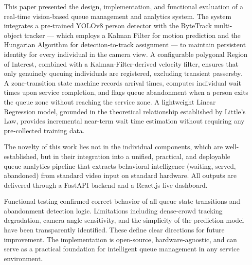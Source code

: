 \documentclass[journal, twocolumn]{IEEEtran}
\begin{document}
This paper presented the design, implementation, and functional evaluation of a real-time vision-based queue management and analytics system. The system integrates a pre-trained YOLOv8 person detector with the ByteTrack multi-object tracker — which employs a Kalman Filter for motion prediction and the Hungarian Algorithm for detection-to-track assignment — to maintain persistent identity for every individual in the camera view. A configurable polygonal Region of Interest, combined with a Kalman-Filter-derived velocity filter, ensures that only genuinely queuing individuals are registered, excluding transient passersby. A zone-transition state machine records arrival times, computes individual wait times upon service completion, and flags queue abandonment when a person exits the queue zone without reaching the service zone. A lightweight Linear Regression model, grounded in the theoretical relationship established by Little's Law, provides incremental near-term wait time estimation without requiring any pre-collected training data.

The novelty of this work lies not in the individual components, which are well-established, but in their integration into a unified, practical, and deployable queue analytics pipeline that extracts behavioral intelligence (waiting, served, abandoned) from standard video input on standard hardware. All outputs are delivered through a FastAPI backend and a React.js live dashboard.

Functional testing confirmed correct behavior of all queue state transitions and abandonment detection logic. Limitations including dense-crowd tracking degradation, camera-angle sensitivity, and the simplicity of the prediction model have been transparently identified. These define clear directions for future improvement. The implementation is open-source, hardware-agnostic, and can serve as a practical foundation for intelligent queue management in any service environment.
\end{document}
